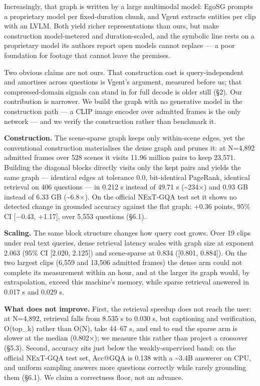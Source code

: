 \documentclass[sigconf,review,anonymous]{acmart}
\begin{document}
Increasingly, that graph is written by a large multimodal model: EgoSG prompts a proprietary
model per fixed-duration chunk, and Vgent extracts entities per clip with an LVLM. Both yield
richer representations than ours, but make construction model-metered and duration-scaled,
and the symbolic line rests on a proprietary model its authors report open models cannot
replace --- a poor foundation for footage that cannot leave the premises.

Two obvious claims are not ours. That construction cost is query-independent and amortises
across questions is Vgent's argument, measured before us; that compressed-domain signals
can stand in for full decode is older still (§2). Our contribution is narrower. We build the
graph with no generative model in the construction path --- a CLIP image encoder over
admitted frames is the only network --- and we verify the construction rather than benchmark
it.

\textbf{Construction.} The scene-sparse graph keeps only within-scene edges, yet the conventional
construction materialises the dense graph and prunes it: at N=4,892 admitted frames over 528
scenes it visits 11.96 million pairs to keep 23,571. Building the diagonal blocks directly
visits only the kept pairs and yields the same graph --- identical edges at tolerance 0.0,
bit-identical PageRank, identical retrieval on 406 questions --- in 0.212 s instead of 49.71 s
(\textasciitilde234\ensuremath{\times}) and 0.93 GB instead of 6.33 GB (\textasciitilde6.8\ensuremath{\times}). On the official NExT-GQA test set
it shows no detected change in grounded accuracy against the flat graph: +0.36 points,
95\% CI {[}\ensuremath{-}0.43, +1.17{]}, over 5,553 questions (§6.1).

\textbf{Scaling.} The same block structure changes how query cost grows. Over 19 clips under real
text queries, dense retrieval latency scales with graph size at exponent 2.063 (95\% CI
{[}2.020, 2.125{]}) and scene-sparse at 0.834 ({[}0.801, 0.884{]}). On the two largest clips
(6,559 and 13,506 admitted frames) the dense arm could not complete its measurement within an
hour, and at the larger its graph would, by extrapolation, exceed this machine's memory, while sparse
retrieval answered in 0.017 s and 0.029 s.

\textbf{What does not improve.} First, the retrieval speedup does not reach the user: at
N=4,892, retrieval falls from 8.535 s to 0.030 s, but captioning and verification, O(top\_k)
rather than O(N), take 44--67 s, and end to end the sparse arm is slower at the median
(0.802\ensuremath{\times}); we measure this rather than project a crossover (§5.3). Second, accuracy sits just
below the weakly-supervised band: on the official NExT-GQA test set, Acc@GQA is 0.138 with a
\textasciitilde3.4B answerer on CPU, and uniform sampling answers more questions correctly while rarely
grounding them (§6.1). We claim a correctness floor, not an advance.
\end{document}
